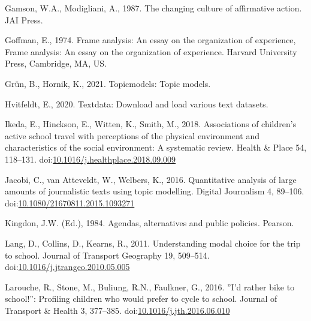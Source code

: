 \documentclass[]{elsarticle} %
\newlength{\cslhangindent}
\newlength{\cslentryspacingunit} %
\newenvironment{CSLReferences}[2] %
 {%
  \setlength{\parindent}{0pt}
  \ifodd #1
  \let\oldpar\par
  \def\par{\hangindent=\cslhangindent\oldpar}
  \fi
  \setlength{\parskip}{#2\cslentryspacingunit}
 }%
 {}
\begin{document}
\begin{CSLReferences}{1}{0}
\leavevmode{}%
Gamson, W.A., Modigliani, A., 1987. The changing culture of affirmative
action. JAI Press.

\leavevmode{}%
Goffman, E., 1974. Frame analysis: An essay on the organization of
experience, Frame analysis: An essay on the organization of experience.
{Harvard University Press}, {Cambridge, MA, US}.

\leavevmode{}%
Grün, B., Hornik, K., 2021. Topicmodels: Topic models.

\leavevmode{}%
Hvitfeldt, E., 2020. Textdata: Download and load various text datasets.

\leavevmode{}%
Ikeda, E., Hinckson, E., Witten, K., Smith, M., 2018. Associations of
children's active school travel with perceptions of the physical
environment and characteristics of the social environment: A systematic
review. Health \& Place 54, 118--131.
doi:\href{https://doi.org/10.1016/j.healthplace.2018.09.009}{10.1016/j.healthplace.2018.09.009}

\leavevmode{}%
Jacobi, C., van Atteveldt, W., Welbers, K., 2016. Quantitative analysis
of large amounts of journalistic texts using topic modelling. Digital
Journalism 4, 89--106.
doi:\href{https://doi.org/10.1080/21670811.2015.1093271}{10.1080/21670811.2015.1093271}

\leavevmode{}%
Kingdon, J.W. (Ed.), 1984. Agendas, alternatives and public policies.
Pearson.

\leavevmode{}%
Lang, D., Collins, D., Kearns, R., 2011. Understanding modal choice for
the trip to school. Journal of Transport Geography 19, 509--514.
doi:\href{https://doi.org/10.1016/j.jtrangeo.2010.05.005}{10.1016/j.jtrangeo.2010.05.005}

\leavevmode{}%
Larouche, R., Stone, M., Buliung, R.N., Faulkner, G., 2016. ''{I}'d
rather bike to school!'': Profiling children who would prefer to cycle
to school. Journal of Transport \& Health 3, 377--385.
doi:\href{https://doi.org/10.1016/j.jth.2016.06.010}{10.1016/j.jth.2016.06.010}


\end{CSLReferences}
\end{document}
